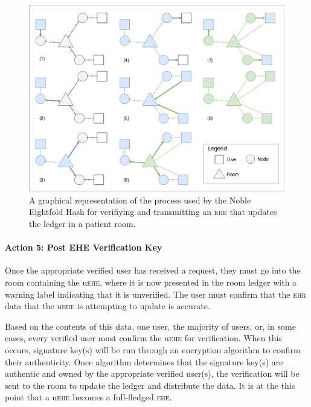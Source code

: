     \begin{figure}
      \begin{center}
      \includegraphics[width=\textwidth]{subfiles/img/diagram-final}
      \caption{A graphical representation of the process used by the Noble Eightfold Hash for verifiying and transmitting an \textsc{ehe} that updates the ledger in a patient room.}
      \label{fig:diagram}
    \end{center}
  \end{figure}

    \paragraph{Action 5: Post EHE Verification Key}
    Once the appropriate verified user has received a request, they must go into the room containing the u\textsc{ehe}, where it is now presented in the room ledger with a warning label indicating that it is unverified. The user must confirm that the \textsc{ehr} data that the u\textsc{ehe} is attempting to update is accurate.%

    Based on the contents of this data, one user, the majority of users, or, in some cases, every verified user must confirm the u\textsc{ehe} for verification. When this occurs, signature key(s) will be run through an encryption algorithm to confirm their authenticity. Once algorithm determines that the signature key(s) are authentic and owned by the appropriate verified user(s), the verification will be sent to the room to update the ledger and distribute the data. It is at the this point that a u\textsc{ehe} becomes a full-fledged \textsc{ehe}.%

